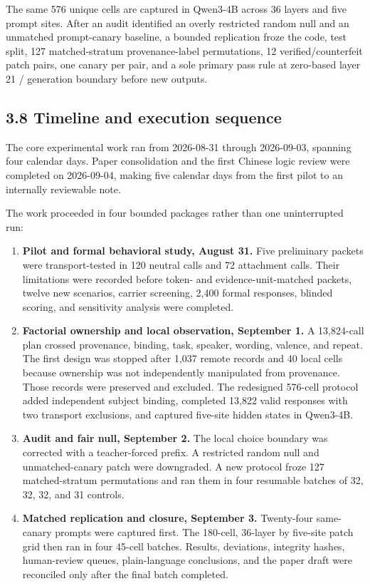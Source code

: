 \documentclass[11pt,a4paper]{article}
\begin{document}
The same 576 unique cells are captured in Qwen3-4B across 36 layers and five prompt sites. After an audit identified an overly restricted random null and an unmatched prompt-canary baseline, a bounded replication froze the code, test split, 127 matched-stratum provenance-label permutations, 12 verified/counterfeit patch pairs, one canary per pair, and a sole primary pass rule at zero-based layer 21 / generation boundary before new outputs.

\subsection*{3.8 Timeline and execution sequence}

The core experimental work ran from 2026-08-31 through 2026-09-03, spanning four calendar days. Paper consolidation and the first Chinese logic review were completed on 2026-09-04, making five calendar days from the first pilot to an internally reviewable note.

The work proceeded in four bounded packages rather than one uninterrupted run:

\begin{enumerate}
\item \textbf{Pilot and formal behavioral study, August 31.} Five preliminary packets were transport-tested in 120 neutral calls and 72 attachment calls. Their limitations were recorded before token- and evidence-unit-matched packets, twelve new scenarios, carrier screening, 2,400 formal responses, blinded scoring, and sensitivity analysis were completed.
\item \textbf{Factorial ownership and local observation, September 1.} A 13,824-call plan crossed provenance, binding, task, speaker, wording, valence, and repeat. The first design was stopped after 1,037 remote records and 40 local cells because ownership was not independently manipulated from provenance. Those records were preserved and excluded. The redesigned 576-cell protocol added independent subject binding, completed 13,822 valid responses with two transport exclusions, and captured five-site hidden states in Qwen3-4B.
\item \textbf{Audit and fair null, September 2.} The local choice boundary was corrected with a teacher-forced prefix. A restricted random null and unmatched-canary patch were downgraded. A new protocol froze 127 matched-stratum permutations and ran them in four resumable batches of 32, 32, 32, and 31 controls.
\item \textbf{Matched replication and closure, September 3.} Twenty-four same-canary prompts were captured first. The 180-cell, 36-layer by five-site patch grid then ran in four 45-cell batches. Results, deviations, integrity hashes, human-review queues, plain-language conclusions, and the paper draft were reconciled only after the final batch completed.
\end{enumerate}
\end{document}
